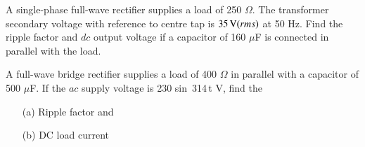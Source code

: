 \begin{example}\label{exam2.19}
A single-phase full-wave rectifier supplies a load of 250
$\Omega$. The transformer secondary voltage with reference to centre
tap is $35 \operatorname{\mathrm{V}} (rms)$ at 50 Hz. Find the ripple factor and $dc$ output
voltage if a capacitor of 160 $\mu$F is connected in parallel with the
load. 
\end{example}


\begin{example}\label{exam2.20}
A full-wave bridge rectifier supplies a load of 400 $\Omega$ in parallel
with a capacitor of 500 $\mu$F. If the $ac$ supply voltage is 230 sin\,
314\,t V, find the 
\begin{itemize}
\item[(a)] Ripple factor and

\item[(b)] DC load current
\end{itemize}
\end{example}

